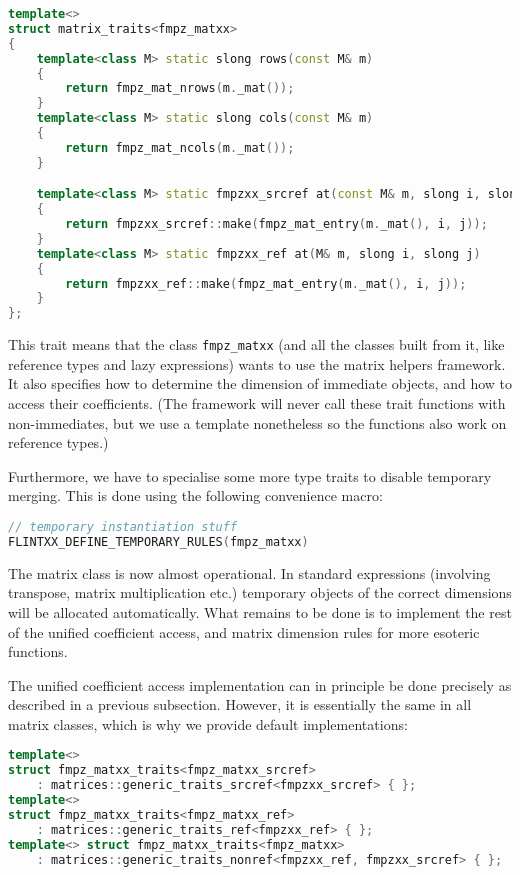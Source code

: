 \documentclass[a4paper,10pt]{book}
\newcommand{\code}{\lstinline}
\begin{document}
{{\begin{lstlisting}[language=c++]
template<>
struct matrix_traits<fmpz_matxx>
{
    template<class M> static slong rows(const M& m)
    {
        return fmpz_mat_nrows(m._mat());
    }
    template<class M> static slong cols(const M& m)
    {
        return fmpz_mat_ncols(m._mat());
    }

    template<class M> static fmpzxx_srcref at(const M& m, slong i, slong j)
    {
        return fmpzxx_srcref::make(fmpz_mat_entry(m._mat(), i, j));
    }
    template<class M> static fmpzxx_ref at(M& m, slong i, slong j)
    {
        return fmpzxx_ref::make(fmpz_mat_entry(m._mat(), i, j));
    }
};
\end{lstlisting}

This trait means that the class \code{fmpz_matxx} (and all the classes built
from it, like reference types and lazy expressions) wants to use the matrix
helpers framework. It also specifies how to determine the dimension of immediate
objects, and how to access their coefficients. (The framework will never call
these trait functions with non-immediates, but we use a template nonetheless so
the functions also work on reference types.)

Furthermore, we have to specialise some more type traits to disable temporary
merging. This is done using the following convenience macro:

\begin{lstlisting}[language=c++]
// temporary instantiation stuff
FLINTXX_DEFINE_TEMPORARY_RULES(fmpz_matxx)
\end{lstlisting}

The matrix class is now almost operational. In standard expressions (involving
transpose, matrix multiplication etc.) temporary objects of the correct dimensions
will be allocated automatically. What remains to be done is to implement the rest of
the unified coefficient access, and matrix dimension rules for more esoteric
functions.

The unified coefficient access implementation can in principle be done precisely
as described in a previous subsection.
However, it is essentially the same in all matrix classes,
which is why we provide default implementations:

\begin{lstlisting}[language=c++]
template<>
struct fmpz_matxx_traits<fmpz_matxx_srcref>
    : matrices::generic_traits_srcref<fmpzxx_srcref> { };
template<>
struct fmpz_matxx_traits<fmpz_matxx_ref>
    : matrices::generic_traits_ref<fmpzxx_ref> { };
template<> struct fmpz_matxx_traits<fmpz_matxx>
    : matrices::generic_traits_nonref<fmpzxx_ref, fmpzxx_srcref> { };
\end{lstlisting}

}}
\end{document}
